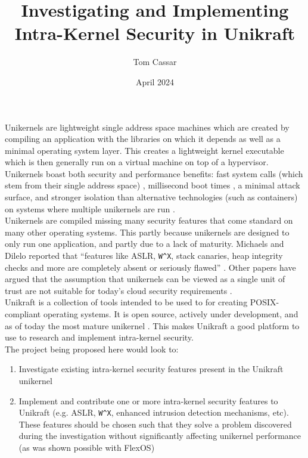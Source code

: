 \documentclass{article}
\title{Investigating and Implementing Intra-Kernel Security in Unikraft}
\author{Tom Cassar}
\date{April 2024}
\begin{document}
\maketitle

\noindent Unikernels are lightweight single address space machines \cite{unikernel-isolation} which are created by compiling an application with the libraries on which it depends as well as a minimal operating system layer. 
This creates a lightweight kernel executable which is then generally run on a virtual machine on top of a hypervisor. 
Unikernels boast both security and performance benefits: fast system calls (which stem from their single address space) \cite{hermitux}, millisecond boot times \cite{unikraft}, a minimal attack surface, and stronger isolation than alternative technologies (such as containers) on systems where multiple unikernels are run \cite{security-perspective}.\\

\noindent Unikernels are compiled missing many security features that come standard on many other operating systems. This partly because unikernels are designed to only run one application, and partly due to a lack of maturity. 
Michaels and Dilelo reported that ``features like ASLR, \texttt{W\^{}X}, stack canaries, heap integrity checks and more are completely absent or seriously flawed'' \cite{michaels2019assessing}.
Other papers have argued that the assumption that unikernels can be viewed as a single unit of trust are not suitable for today's cloud security requirements \cite{unikernel-isolation}.\\

\noindent Unikraft \cite{unikraft-paper} is a collection of tools intended to be used to for creating POSIX-compliant operating systems. 
It is open source, actively under development, and as of today the most mature unikernel \cite{unikraft-coming-age}. 
This makes Unikraft a good platform to use to research and implement intra-kernel security.\\

\noindent The project being proposed here would look to:

\begin{enumerate}
    \item Investigate existing intra-kernel security features present in the Unikraft unikernel
    \item Implement and contribute one or more intra-kernel security features to Unikraft (e.g. ASLR, \texttt{W\^{}X}, enhanced intrusion detection mechanisms, etc). These features should be chosen such that they solve a problem discovered during the investigation without significantly affecting unikernel performance (as was shown possible with FlexOS) \cite{flexos}
\end{enumerate}
\end{document}
